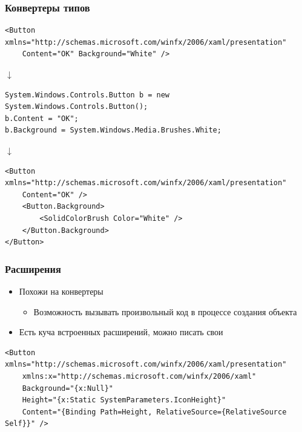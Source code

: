 \documentclass[xetex,mathserif,serif]{beamer}
\newcommand{\DownArrow} {
    \hspace{2cm}\begin{LARGE}$\downarrow$\end{LARGE}
}
\begin{document}
    \begin{frame}[fragile]
        \frametitle{Конвертеры типов}
        \begin{footnotesize}
            \begin{verbatim}
<Button xmlns="http://schemas.microsoft.com/winfx/2006/xaml/presentation"
    Content="OK" Background="White" />
            \end{verbatim}
        \end{footnotesize}

        \DownArrow
        \begin{footnotesize}
            \begin{verbatim}
System.Windows.Controls.Button b = new System.Windows.Controls.Button();
b.Content = "OK";
b.Background = System.Windows.Media.Brushes.White;
            \end{verbatim}
        \end{footnotesize}

        \DownArrow
        \begin{footnotesize}
            \begin{verbatim}
<Button xmlns="http://schemas.microsoft.com/winfx/2006/xaml/presentation"
    Content="OK" />
    <Button.Background>
        <SolidColorBrush Color="White" />
    </Button.Background>
</Button>
            \end{verbatim}
        \end{footnotesize}
    \end{frame}

    \begin{frame}[fragile]
        \frametitle{Расширения}
        \begin{itemize}
            \item Похожи на конвертеры
            \begin{itemize}
                \item Возможность вызывать произвольный код в процессе создания объекта
            \end{itemize}
            \item Есть куча встроенных расширений, можно писать свои
        \end{itemize}
        \begin{footnotesize}
            \begin{verbatim}
<Button xmlns="http://schemas.microsoft.com/winfx/2006/xaml/presentation"
    xmlns:x="http://schemas.microsoft.com/winfx/2006/xaml"
    Background="{x:Null}"
    Height="{x:Static SystemParameters.IconHeight}"
    Content="{Binding Path=Height, RelativeSource={RelativeSource Self}}" />
            \end{verbatim}
        \end{footnotesize}
    \end{frame}
\end{document}
